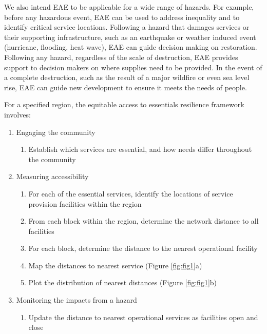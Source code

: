\documentclass[onecolumn,doublespacing]{risa}
\begin{document}
We also intend EAE to be applicable for a wide range of hazards. 
For example, before any hazardous event, EAE can be used to address inequality and to identify critical service locations. 
Following a hazard that damages services or their supporting infrastructure, such as an earthquake or weather induced event (hurricane, flooding, heat wave), EAE can guide decision making on restoration.
Following any hazard, regardless of the scale of destruction, EAE provides support to decision makers on where supplies need to be provided.
In the event of a complete destruction, such as the result of a major wildfire or even sea level rise, EAE can guide new development to ensure it meets the needs of people.

For a specified region, the equitable access to essentials resilience framework involves: 
\begin{enumerate}[topsep=1pt,itemsep=0em,partopsep=1ex,parsep=1ex]
    \item Engaging the community 
    \begin{enumerate}[topsep=0pt,itemsep=-2pt,partopsep=1ex,parsep=1ex]
        \item Establish which services are essential, and how needs differ throughout the community
    \end{enumerate}
    \item Measuring accessibility
    \begin{enumerate}[topsep=0pt,itemsep=-2pt,partopsep=1ex,parsep=1ex]
        \item For each of the essential services, identify the locations of service provision facilities within the region
        \item From each block within the region, determine the network distance to all facilities
        \item For each block, determine the distance to the nearest operational facility
        \item Map the distances to nearest service (Figure \ref{fig:fig1}a)
        \item Plot the distribution of nearest distances (Figure \ref{fig:fig1}b)
    \end{enumerate}
    \item Monitoring the impacts from a hazard
    \begin{enumerate}[topsep=0pt,itemsep=-2pt,partopsep=1ex,parsep=1ex]
        \item Update the distance to nearest operational services as facilities open and close

\end{enumerate}
\end{enumerate}
\end{document}

